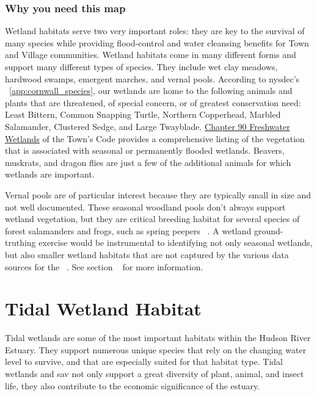 \subsection*{Why you need this map}
Wetland habitats serve two very important roles: they are key to the survival
of many species while providing flood-control and water cleansing benefits for
Town and Village communities. Wetland habitats come in many different forms and
support many different types of species. They include wet clay meadows,
hardwood swamps, emergent marches, and vernal pools. According to
\gls{nysdec}'s 
~\ref{app:cornwall_species}, our wetlands are home to the following
animals and plants that are threatened, of special concern, or of greatest
conservation need: Least Bittern, Common Snapping Turtle, Northern Copperhead,
Marbled Salamander, Clustered Sedge, and Large Twayblade.
\href{https://ecode360.com/10555547?highlight=wetlands#10555547}{Chapter 90
Freshwater Wetlands} of the Town’s Code provides a comprehensive listing of the
vegetation that is associated with seasonal or permanently flooded wetlands.
Beavers, muskrats, and dragon flies are just a few of the additional animals
for which wetlands are important.
\par
Vernal pools are of particular interest because they are typically small in
size and not well documented. These seasonal woodland pools don't always
support wetland vegetation, but they are critical breeding habitat for several
species of forest salamanders and frogs, such as spring peepers
~\citep{haeckel2014}. A wetland ground-truthing exercise would be instrumental
to identifying not only seasonal wetlands, but also smaller wetland habitats
that are not captured by the various data sources for the 
~. See section ~
for more information.

\label{map:tidalwetlandsandSAV}
\chapter{Tidal Wetland Habitat}\label{subsec:tidalandwetlandhabitat}
Tidal wetlands are some of the most important habitats within the Hudson River
Estuary. They support numerous unique species that rely on the changing water
level to survive, and that are especially suited for that habitat type. Tidal
wetlands and \gls{sav} not only support a great diversity of plant, animal, and
insect life, they also contribute to the economic significance of the estuary.

